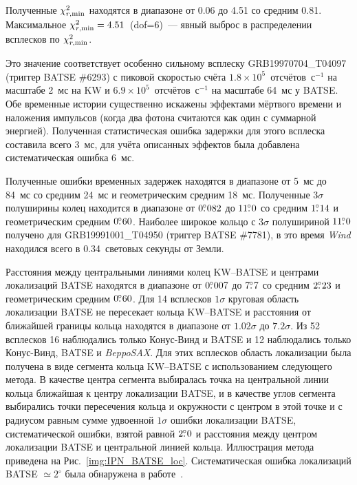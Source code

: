 Полученные $\chi^2_{r,{\mathrm{min}}}$ находятся в диапазоне от 0.06 до 4.51 со 
средним 0.81. Максимальное $\chi^2_{r,{\mathrm{min}}}=4.51$~(dof=6)~--- явный выброс 
в распределении всплесков по $\chi^2_{r,{\mathrm{min}}}$.

Это значение соответствует особенно сильному всплеску GRB19970704\_T04097 
(триггер BATSE \#6293) с пиковой скоростью счёта $1.8\times10^5$~отсчётов~с$^{-1}$ 
на масштабе 2~мс на KW и $6.9\times10^5$~отсчётов~с$^{-1}$ на масштабе 64~мс у BATSE. 
Обе временные истории существенно искажены эффектами мёртвого времени и наложения 
импульсов (когда два фотона считаются как один с суммарной энергией). 
Полученная статистическая ошибка задержки для этого всплеска составила всего 3~мс, 
для учёта описанных эффектов была добавлена систематическая ошибка 6~мс.

Полученные ошибки временных задержек находятся в диапазоне от 5~мс до 84~мс со 
средним 24~мс и геометрическим средним 18~мс. Полученные $3\sigma$ полуширины  
колец находится в диапазоне от $0\mbox{$.\!\!^\circ$}082$ до $11\mbox{$.\!\!^\circ$}0$ 
со средним $1\mbox{$.\!\!^\circ$}14$ и геометрическим средним $0\mbox{$.\!\!^\circ$}60$. 
Наиболее широкое кольцо с $3\sigma$ полушириной $11\mbox{$.\!\!^\circ$}0$ получено 
для GRB19991001\_T04950 (триггер BATSE \#7781), в это время \textit{Wind} находился 
всего в 0.34~световых секунды от Земли.

Расстояния между центральными линиями колец KW--BATSE и центрами локализаций 
BATSE находятся в диапазоне от $0\mbox{$.\!\!^\circ$}007$ до $7\mbox{$.\!\!^\circ$}7$ 
со средним $2\mbox{$.\!\!^\circ$}23$ и геометрическим средним $0\mbox{$.\!\!^\circ$}60$. 
Для 14 всплесков $1\sigma$ круговая область локализации BATSE не пересекает кольца 
KW--BATSE и расстояния от ближайшей границы кольца находятся в диапазоне 
от $1.02\sigma$ до $7.2\sigma$. Из 52 всплесков 16 наблюдались только Конус-Винд 
и BATSE и 12 наблюдались только Конус-Винд, BATSE и \textit{BeppoSAX}. Для этих 
всплесков область локализации была получена в виде сегмента кольца KW--BATSE 
с использованием следующего метода. В качестве центра сегмента выбиралась точка 
на центральной линии кольца ближайшая к центру локализации BATSE, и в качестве 
углов сегмента выбирались точки пересечения кольца и окружности с центром в этой 
точке и с радиусом равным сумме удвоенной $1\sigma$ ошибки локализации BATSE, 
систематической ошибки, взятой равной $2\mbox{$.\!\!^\circ$}0$ и расстояния между 
центром локализации BATSE и центральной линией кольца. Иллюстрация метода приведена 
на Рис.~\ref{img:IPN_BATSE_loc}. Систематическая ошибка локализаций BATSE $\simeq 2^{\circ}$ 
была обнаружена в работе~\citep{Briggs_1999ApJS}.

